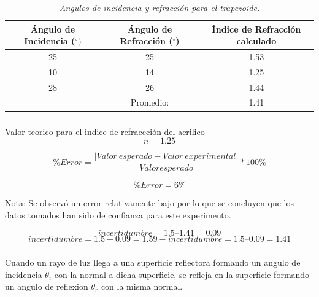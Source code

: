 \documentclass{article}
\begin{document}
\subsubsection{}

\begin{table}[h!]
\begin{center}
\begin{tabular}{ |c|c|c| } 
 \hline
 Ángulo de Incidencia ($^{\circ})$ & Ángulo de Refracción ($^{\circ}$)& Índice de Refracción calculado\\ 
 \hline
 25 & 25 & 1.53  \\ 
 10 & 14 & 1.25  \\ 
 28 & 26 & 1.44  \\
 \hline
 & Promedio: & 1.41 \\
 \hline
\end{tabular}
\caption{ \emph{Angulos de incidencia y refracción para el trapezoide.}}
\label{table:1}
\end{center}
\end{table}



\subsubsection{}
Valor teorico para el indice de refraccción del acrilico
\begin{equation}
    n=1.25
\end{equation}

\begin{equation}
    \% Error = \frac{|Valor \ esperado-Valor \ experimental|}{Valor esperado}*100\%
\end{equation}

\begin{equation}
    \% Error =6\%
\end{equation}

Nota: Se observó un error relativamente bajo por lo que se concluyen que los datos tomados han sido de confianza para este experimento.

\begin{equation}
    incertidumbre=1.5 – 1.41 = 0.09
\end{equation}
\begin{equation}
    incertidumbre = 1.5+ 0.09 = 1.59 - incertidumbre= 1.5 – 0.09 = 1.41  
\end{equation}

\subsubsection{}
Cuando un rayo de luz llega a una superficie reflectora formando un angulo de incidencia $\theta_{i}$ con la normal a dicha superficie, se refleja en la superficie formando un angulo de reflexion $\theta_{r}$ con la misma normal.
\end{document}
